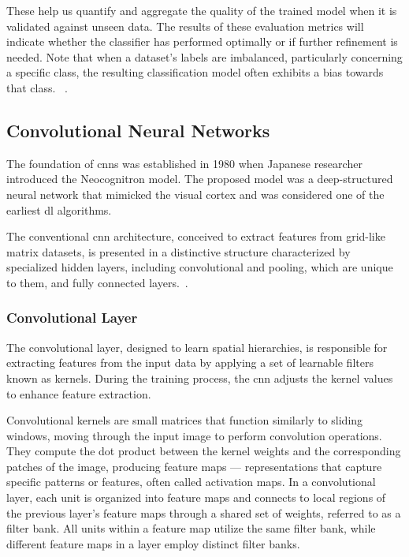 These help us quantify and aggregate the quality of the trained model when it is validated against unseen data. The results of these evaluation metrics will indicate whether the classifier has performed optimally or if further refinement is needed. Note that when a dataset's labels are imbalanced, particularly concerning a specific class, the resulting classification model often exhibits a bias towards that class.
~\cite{naidu_review_2023}.



\FloatBarrier


\subsection{Convolutional Neural Networks}

The foundation of \acfp{cnn} was established in 1980 when Japanese researcher \textcite{fukushima_neocognitron_1980} introduced the Neocognitron model. The proposed model was a deep-structured neural network that mimicked the visual cortex and was considered one of the earliest \ac{dl} algorithms.

The conventional \ac{cnn} architecture, conceived to extract features from grid-like matrix datasets, is presented in a distinctive structure characterized by specialized hidden layers, including convolutional and pooling, which are unique to them, and fully connected layers.~\cite{lecun_deep_2015, dai_introduction_2021}. 

\subsubsection{Convolutional Layer} %
The convolutional layer, designed to learn spatial hierarchies, is responsible for extracting features from the input data by applying a set of learnable filters known as kernels. During the training process, the \ac{cnn} adjusts the kernel values to enhance feature extraction.

Convolutional kernels are small matrices that function similarly to sliding windows, moving through the input image to perform convolution operations. They compute the dot product between the kernel weights and the corresponding patches of the image, producing feature maps — representations that capture specific patterns or features, often called activation maps. In a convolutional layer, each unit is organized into feature maps and connects to local regions of the previous layer's feature maps through a shared set of weights, referred to as a filter bank.
All units within a feature map utilize the same filter bank, while different feature maps in a layer employ distinct filter banks.
 
